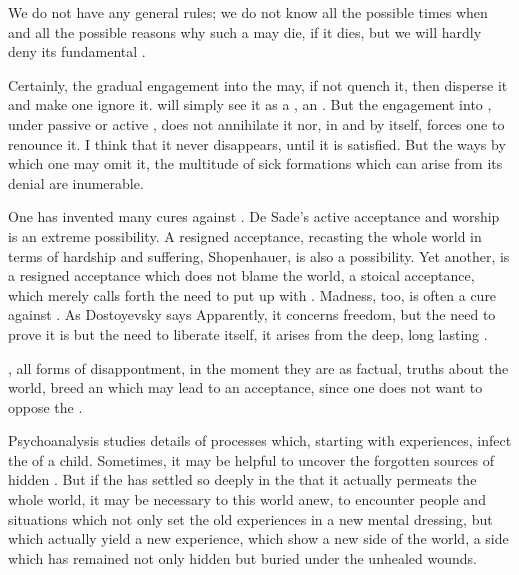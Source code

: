 {We do not have any general rules; we do not know all the possible times
when and all the possible reasons why such a  may die, if it
dies, but we will hardly deny its fundamental .

\pa
Certainly, the gradual engagement into the  may, if
not quench it, then disperse it and make one ignore it. 
 will simply see it as a , an .  But the engagement into , under passive or
active \No, does not annihilate it nor, in and by itself, forces one
to renounce it.  I think that it never disappears, until it is
satisfied.   But the ways by which one may omit it, 
the multitude of sick formations which can arise from its denial are 
inumerable. 


\pa One has invented many cures against .  De Sade's active
acceptance and worship is an extreme possibility.  A resigned
acceptance, recasting the whole world in terms of hardship and
suffering,  Shopenhauer, is also a possibility.  Yet
another, is a resigned acceptance which does not blame the world, a
stoical acceptance, which merely calls forth the need to put up with
.  Madness, too, is often a cure against .  As
Dostoyevsky says  Apparently, it concerns freedom, but the need to prove it
is but the need to liberate itself, it arises from the deep, long
lasting .

, all forms of 
disappontment, in the moment they are  as factual, 
 truths about the world, breed an  
which may lead to an acceptance, since one does not want to oppose 
the .

Psychoanalysis studies details of processes which, starting with
 experiences, infect the  of a child.  Sometimes,
it may be helpful to uncover the forgotten sources of hidden
.  But if the  has settled so deeply in the
 that it actually permeats the whole world, it may be
necessary to  this world anew, to encounter people
and situations which not only set the old experiences in a new mental
dressing, but which actually yield a new experience, which show a new
side of the world, a side which has remained not only hidden but 
buried under the unhealed wounds.


}
